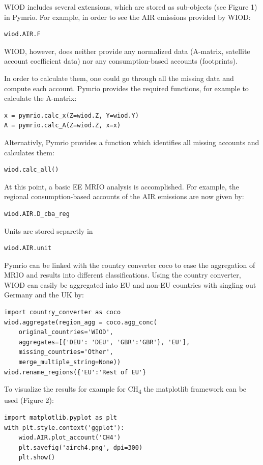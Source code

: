\documentclass{jors}
\begin{document}
WIOD includes several extensions, which are stored as sub-objects (see Figure 1) in Pymrio. 
For example, in order to see the AIR emissions provided by WIOD:

\begin{lstlisting}
wiod.AIR.F
\end{lstlisting}

WIOD, however, does neither provide any normalized data (A-matrix, satellite account coefficient data) nor any consumption-based accounts (footprints).

In order to calculate them, one could go through all the missing data and compute each account. 
Pymrio provides the required functions, for example to calculate the A-matrix:
\begin{lstlisting}
x = pymrio.calc_x(Z=wiod.Z, Y=wiod.Y)
A = pymrio.calc_A(Z=wiod.Z, x=x)
\end{lstlisting}

Alternativly, Pymrio provides a function which identifies all missing accounts and calculates them:
\begin{lstlisting}
wiod.calc_all()
\end{lstlisting}

At this point, a basic EE MRIO analysis is accomplished. For example, the regional consumption-based accounts of the AIR emissions are now given by:
\begin{lstlisting}
wiod.AIR.D_cba_reg
\end{lstlisting}

Units are stored separetly in 
\begin{lstlisting}
wiod.AIR.unit
\end{lstlisting}

Pymrio can be linked with the country converter coco \cite{stadler2017_country} to ease the aggregation of MRIO and results into different classifications.
Using the country converter, WIOD can easily be aggregated into EU and non-EU countries with singling out Germany and the UK by:

\begin{lstlisting}
import country_converter as coco
wiod.aggregate(region_agg = coco.agg_conc(
    original_countries='WIOD',
    aggregates=[{'DEU': 'DEU', 'GBR':'GBR'}, 'EU'],
    missing_countries='Other',
    merge_multiple_string=None))
wiod.rename_regions({'EU':'Rest of EU'}
\end{lstlisting}

To visualize the results for example for CH\textsubscript{4} the matplotlib framework \cite{hunter2007_Matplotlib} can be used (Figure 2):
\begin{lstlisting}
import matplotlib.pyplot as plt
with plt.style.context('ggplot'):
    wiod.AIR.plot_account('CH4')
    plt.savefig('airch4.png', dpi=300)
    plt.show()
\end{lstlisting}
\end{document}
